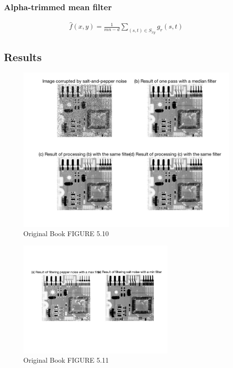 \documentclass[11pt,oneside]{book}
\begin{document}
\subsubsection{Alpha-trimmed mean filter}
\begin{align}
\hat{f}(x,y) = \frac{1}{mn-d}\sum_{(s,t)\in S_{xy}}g_r(s,t)
\end{align}
\newpage
\subsection{Results}
\begin{figure}[!htb]
   \centering  
   \includegraphics[width=1.0\textwidth]{images/4/order1.jpg}
   \caption{Original Book FIGURE 5.10}
\end{figure}
\begin{figure}[!htb]
   \centering  
   \includegraphics[width=0.7\textwidth]{images/4/order2.jpg}
   \caption{Original Book FIGURE 5.11}
\end{figure}
\end{document}

